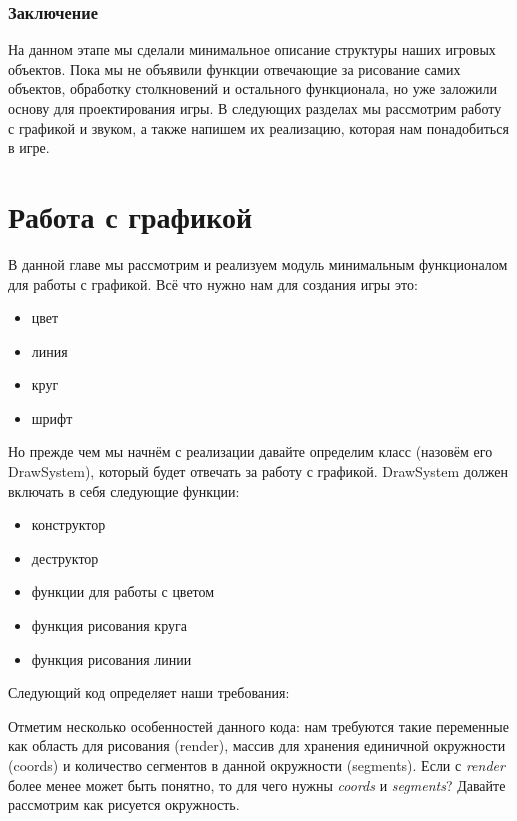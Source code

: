 \subsection{Заключение}
На данном этапе мы сделали минимальное описание структуры наших игровых объектов. Пока мы не объявили 
функции отвечающие за рисование самих объектов, обработку столкновений и остального функционала, но уже 
заложили основу для проектирования игры. В следующих разделах мы рассмотрим работу с графикой и звуком, а 
также напишем их реализацию, которая нам понадобиться в игре.

\pagebreak

\chapter{Работа с графикой}
В данной главе мы рассмотрим и реализуем модуль минимальным функционалом для работы с графикой. 
Всё что нужно нам для создания игры это:
\begin{itemize}\itemsep-5pt
    \item цвет
    \item линия
    \item круг
    \item шрифт
\end{itemize}

Но прежде чем мы начнём с реализации давайте определим класс (назовём его DrawSystem), который будет отвечать 
за работу с графикой. DrawSystem должен включать в себя следующие функции:
\begin{itemize}\itemsep-5pt
    \item конструктор
    \item деструктор
    \item функции для работы с цветом
    \item функция рисования круга
    \item функция рисования линии
\end{itemize}

Следующий код определяет наши требования:


Отметим несколько особенностей данного кода: нам требуются такие переменные как область для рисования (render),
массив для хранения единичной окружности (coords) и количество сегментов в данной окружности (segments). 
Если с \emph{render} более менее может быть понятно, то для чего нужны \emph{coords} и \emph{segments}? Давайте 
рассмотрим как рисуется окружность.

